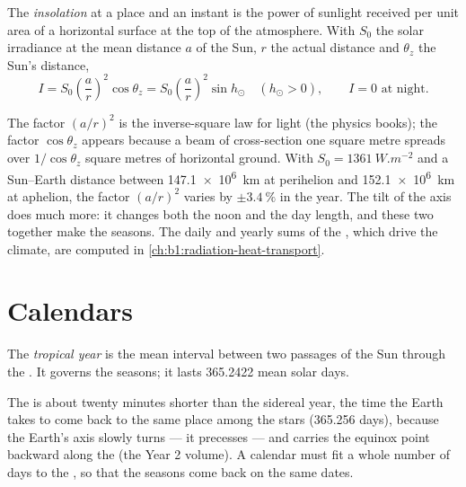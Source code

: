 \begin{definition}[Insolation]\label{def:b1:spherical-astronomy:insolation}
The \emph{insolation} at a place and an instant is the
power of sunlight received per unit area of a horizontal surface at the top
of the atmosphere. With $S_0$ the solar irradiance at the mean distance $a$
of the Sun, $r$ the actual distance and $\theta_z$ the Sun's  distance,
\[
  I = S_0\left(\frac{a}{r}\right)^{2}\cos\theta_z = S_0\left(\frac{a}{r}\right)^{2}\sin h_\odot
  \quad (h_\odot > 0), \qquad I = 0 \text{ at night}.
\]
\end{definition}

The factor $(a/r)^2$ is the inverse-square law for light (the physics books);
the factor $\cos\theta_z$ appears because a beam of cross-section one square
metre spreads over $1/\cos\theta_z$ square metres of horizontal ground. With
$S_0 = \qty{1361}{W.m^{-2}}$ and a Sun--Earth distance between
\qty{147.1e6}{km} at perihelion and \qty{152.1e6}{km} at aphelion, the factor
$(a/r)^2$ varies by $\pm\qty{3.4}{\percent}$ in the year. The tilt of the axis
does much more: it changes both the noon  and the day length, and
these two together make the seasons. The daily and yearly sums of the
, which drive the climate, are computed in
\cref{ch:b1:radiation-heat-transport}.


\section{Calendars}

\begin{definition}\label{def:b1:spherical-astronomy:tropical-year}
The \emph{tropical year} is the mean interval between
two passages of the Sun through the . It governs the
seasons; it lasts 365.2422 mean solar days.
\end{definition}

The  is about twenty minutes shorter than the sidereal year, the
time the Earth takes to come back to the same place among the stars
(365.256 days), because the Earth's axis slowly turns --- it precesses --- and
carries the equinox point backward along the  (the Year 2 volume).
A calendar must fit a whole number of days to the , so that the
seasons come back on the same dates.


